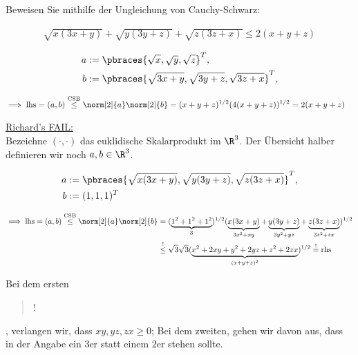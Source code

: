 
\begin{exercise}

Beweisen Sie mithilfe der Ungleichung von Cauchy-Schwarz:

\begin{align*}
    \sqrt{x (3x + y)} + \sqrt{y (3y + z)} + \sqrt{z (3z + x)}
    \leq
    2 (x + y + z)
\end{align*}

\end{exercise}


\begin{solution}

\begin{align*}
    a & := \pbraces
    {
        \sqrt{x},
        \sqrt{y},
        \sqrt{z}
    }^T, \\
    b & := \pbraces
    {
        \sqrt{3x + y},
        \sqrt{3y + z},
        \sqrt{3z + x}
    }^T, \\
\end{align*}

\begin{align*}
    \implies
    \text{lhs}
    =
    (a, b)
    \stackrel{\text{CSB}}{\leq}
    \norm[2]{a} \norm[2]{b}
    & =
    (x + y + z)^{1/2}
    (4(x+y+z)
    )^{1/2} = 2(x+y+z)
\end{align*}

\underline{Richard's FAIL:} \\

Bezeichne $(\cdot, \cdot)$ das euklidische Skalarprodukt im $\R^3$.
Der Übersicht halber definieren wir noch $a, b \in \R^3$.

\begin{align*}
    a & := \pbraces
    {
        \sqrt{x (3x + y)},
        \sqrt{y (3y + z)},
        \sqrt{z (3z + x)}
    }^T, \\
    b & := (1, 1, 1)^T
\end{align*}

\begin{align*}
    \implies
    \text{lhs}
    =
    (a, b)
    \stackrel{\text{CSB}}{\leq}
    \norm[2]{a} \norm[2]{b}
    & =
    (
        \underbrace
        {1^2 + 1^2 + 1^2}_{3}
    )^{1/2}
    (
        \underbrace{x (3x + y)}_{3x^2 + xy}
        +
        \underbrace{y (3y + z)}_{3y^2 + yz}
        +
        \underbrace{z (3z + x)}_{3z^2 + zx}
    )^{1/2} \\
    & \stackrel{!}{\leq}
    \sqrt{3} \sqrt{3}
    (
        \underbrace
        {x^2 + 2xy + y^2 + 2yz + z^2 + 2zx}_{(x + y + z)^2}
    )^{1/2}
    \stackrel{!}{=}
    \text{rhs}
\end{align*}

Bei dem ersten \blockquote{!}, verlangen wir, dass $xy, yz, zx \geq 0$;
Bei dem zweiten, gehen wir davon aus, dass in der Angabe ein $3$er statt einem $2$er stehen sollte.

\end{solution}

